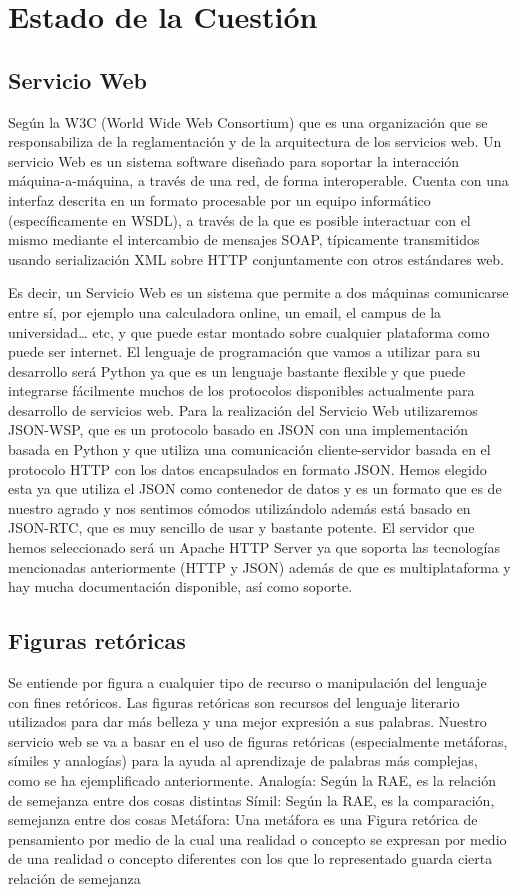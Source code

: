 \chapter{Estado de la Cuestión}
\label{cap:estadoDeLaCuestion}

\section{Servicio Web}
Según la W3C (World Wide Web Consortium) que es una organización que se responsabiliza de la reglamentación y de la arquitectura de los servicios web. Un servicio Web es un sistema software diseñado para soportar la interacción máquina-a-máquina, a través de una red, de forma interoperable.  Cuenta con una interfaz descrita en un formato procesable por un equipo informático (específicamente en WSDL), a través de la que es posible interactuar con el mismo mediante el intercambio de mensajes SOAP, típicamente transmitidos usando serialización XML sobre HTTP conjuntamente con otros estándares web.


Es decir, un Servicio Web es un sistema que permite a dos máquinas comunicarse entre sí, por ejemplo una calculadora online, un email, el campus de la universidad… etc, y que puede estar montado sobre cualquier plataforma como puede ser internet.
El lenguaje de programación que vamos a utilizar para su desarrollo será Python ya que es un lenguaje bastante flexible y que puede integrarse fácilmente muchos de los protocolos disponibles actualmente para desarrollo de servicios web.
Para la realización del Servicio Web utilizaremos JSON-WSP, que es un protocolo basado en JSON con una implementación basada en Python y que utiliza una comunicación cliente-servidor basada en el protocolo HTTP con los datos encapsulados en formato JSON.
Hemos elegido esta ya que utiliza el JSON como contenedor de datos y es un formato que es de nuestro agrado y nos sentimos cómodos utilizándolo además está basado en JSON-RTC, que es muy sencillo de usar y bastante potente.
El servidor que hemos seleccionado será un Apache HTTP Server ya que soporta las tecnologías mencionadas anteriormente (HTTP y JSON) además de que es multiplataforma y hay mucha documentación disponible, así como soporte.

\section{Figuras retóricas}
Se entiende por figura a cualquier tipo de recurso o manipulación del lenguaje con fines retóricos.
Las figuras retóricas son recursos del lenguaje literario utilizados para dar más belleza y una mejor expresión a sus palabras.
Nuestro servicio web se va a basar en el uso de figuras retóricas (especialmente metáforas, símiles y analogías) para la ayuda al aprendizaje de palabras más complejas, como se ha ejemplificado anteriormente.
Analogía: Según la RAE, es la relación de semejanza entre dos cosas distintas
Símil: Según la RAE, es la comparación, semejanza entre dos cosas
Metáfora: Una metáfora es una Figura retórica de pensamiento por medio de la cual una realidad o concepto se expresan por medio de una realidad o concepto diferentes con los que lo representado guarda cierta relación de semejanza

